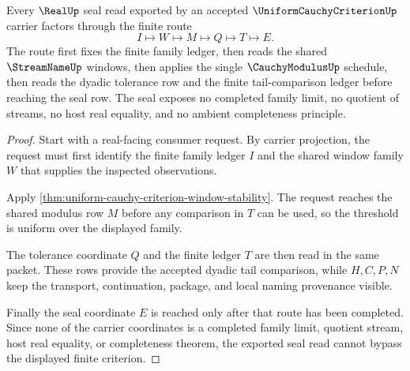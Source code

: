 \begin{theorem}
\label{thm:uniform-cauchy-criterion-real-seal-handoff}
Every $\RealUp$ seal read exported by an accepted $\UniformCauchyCriterionUp$ carrier factors through the finite route
$$
I \longmapsto W \longmapsto M \longmapsto Q \longmapsto T \longmapsto E.
$$
The route first fixes the finite family ledger, then reads the shared $\StreamNameUp$ windows, then applies the single $\CauchyModulusUp$ schedule, then reads the dyadic tolerance row and the finite tail-comparison ledger before reaching the seal row. The seal exposes no completed family limit, no quotient of streams, no host real equality, and no ambient completeness principle.
\end{theorem}
\begin{proof}
Start with a real-facing consumer request. By carrier projection, the request must first identify the finite family ledger $I$ and the shared window family $W$ that supplies the inspected observations.

Apply \autoref{thm:uniform-cauchy-criterion-window-stability}. The request reaches the shared modulus row $M$ before any comparison in $T$ can be used, so the threshold is uniform over the displayed family.

The tolerance coordinate $Q$ and the finite ledger $T$ are then read in the same packet. These rows provide the accepted dyadic tail comparison, while $H,C,P,N$ keep the transport, continuation, package, and local naming provenance visible.

Finally the seal coordinate $E$ is reached only after that route has been completed. Since none of the carrier coordinates is a completed family limit, quotient stream, host real equality, or completeness theorem, the exported seal read cannot bypass the displayed finite criterion.
\end{proof}

